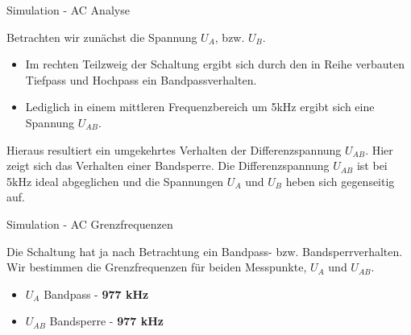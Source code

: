\begin{frame}[t]{Simulation - AC Analyse}

  Betrachten wir zunächst die Spannung $U_A$, bzw. $U_B$.

  \begin{itemize}
    \item Im rechten Teilzweig der Schaltung ergibt sich durch den in Reihe verbauten Tiefpass und Hochpass ein Bandpassverhalten.
    \item Lediglich in einem mittleren Frequenzbereich um 5kHz ergibt sich eine Spannung $U_{AB}$.
  \end{itemize}

  Hieraus resultiert ein umgekehrtes Verhalten der Differenzspannung $U_{AB}$. Hier zeigt sich das Verhalten einer Bandsperre.
  Die Differenzspannung $U_{AB}$ ist bei 5kHz ideal abgeglichen und die Spannungen $U_{A}$ und $U_{B}$ heben sich gegenseitig auf.
\end{frame}

\begin{frame}[t]{Simulation - AC Grenzfrequenzen}

  Die Schaltung hat ja nach Betrachtung ein Bandpass- bzw. Bandsperrverhalten. Wir bestimmen die Grenzfrequenzen für beiden Messpunkte, $U_A$ und $U_{AB}$.
  \begin{itemize}
    \item $U_A$ Bandpass - \textbf{977 kHz}
    \item $U_{AB}$ Bandsperre - \textbf{977 kHz}
  \end{itemize}

  \begin{figure}
    \centering
    \qquad
  \end{figure}

\end{frame}

